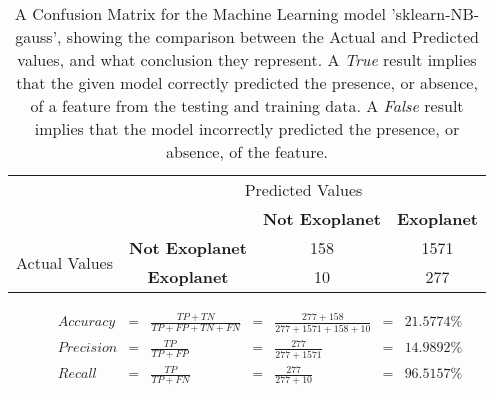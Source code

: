 
    \renewcommand{\arraystretch}{2}
    \renewcommand{\tabcolsep}{20.25pt}
    \begin{table}[ht]
    \begin{tabular}{cccc}
     & \multicolumn{3}{c}{Predicted Values} \\ \cline{3-4}
     & \multicolumn{1}{c|}{} & \multicolumn{1}{c|}{\textbf{Not Exoplanet}} & \multicolumn{1}{c|}{\textbf{Exoplanet}} \\ \cline{2-4}
    \multicolumn{1}{c|}{\multirow{2}{2.0cm}{Actual Values}} & \multicolumn{1}{c|}{\textbf{Not Exoplanet}} & \multicolumn{1}{c|}{158} & \multicolumn{1}{c|}{1571} \\ \cline{2-4}
    \multicolumn{1}{c|}{} & \multicolumn{1}{c|}{\textbf{Exoplanet}} & \multicolumn{1}{c|}{10} & \multicolumn{1}{c|}{277} \\ \cline{2-4}
    \end{tabular}
    \caption{A Confusion Matrix for the Machine Learning model 'sklearn-NB-gauss', showing the comparison between the Actual and Predicted values, and what conclusion they represent. A \emph{True} result implies that the given model correctly predicted the presence, or absence, of a feature from the testing and training data. A \emph{False} result implies that the model incorrectly predicted the presence, or absence, of the feature.}
    \label{tab:sklearn-NB-gaussconfusionmatrix}
    \end{table}

    \label{eq:precisionsklearn-NB-gauss}
    \begin{align*}
        Accuracy &= &\frac{TP + TN}{TP + FP + TN + FN} &= &\frac{277 + 158}{277 + 1571 + 158 + 10} &= & 21.5774\% \\
        Precision &= &\frac{TP}{TP + FP} &= &\frac{277}{277 + 1571} &= & 14.9892\% \\
        Recall &= &\frac{TP}{TP + FN} &= &\frac{277}{277 + 10} &= & 96.5157\% \\
    \end{align*}

    \renewcommand{\arraystretch}{1}
    \renewcommand{\tabcolsep}{5.25pt}
    